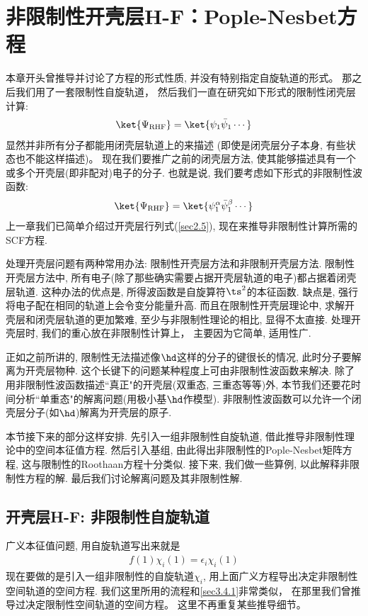 \section{非限制性开壳层H-F：Pople-Nesbet方程}
本章开头曾推导并讨论了\hft 方程的形式性质, 
并没有特别指定自旋轨道的形式。 
那之后我们用了一套限制性自旋轨道， 
然后我们一直在研究如下形式的限制性闭壳层计算:
\begin{align}
	\ket{\Psi_\mathrm{RHF}} = \ket{\psi_1\bar{\psi}_1\cdots}
\end{align}
显然并非所有分子都能用闭壳层轨道上的来描述
(即使是闭壳层分子本身, 有些状态也不能这样描述)。
现在我们要推广之前的闭壳层方法, 
使其能够描述具有一个或多个开壳层(即非配对)电子的分子. 
也就是说, 
我们要考虑如下形式的非限制性波函数:
\begin{align}
	\ket{\Psi_\mathrm{RHF}} = \ket{\psi_1^\alpha\bar{\psi}_1^\beta\cdots}
\end{align}
上一章我们已简单介绍过开壳层行列式(\autoref{sec2.5}), 
现在来推导非限制性计算所需的SCF方程.


处理开壳层问题有两种常用办法: 限制性开壳层\hft 方法和非限制开壳层\hft 方法. 
限制性开壳层方法中, 
所有电子(除了那些确实需要占据开壳层轨道的电子)都占据着闭壳层轨道. 
这种办法的优点是, 
所得波函数是自旋算符$\ts^2$的本征函数. 
缺点是, 
强行将电子配在相同的轨道上会令变分能量升高. 
而且在限制性开壳层\hft 理论中, 
求解开壳层和闭壳层轨道的更加繁难, 
至少与非限制性\hft 理论的相比, 
显得不太直接. 
处理开壳层时, 
我们的重心放在非限制性计算上， 
主要因为它简单, 
适用性广.


正如之前所讲的, 
限制性\hft  无法描述像$\hd$这样的分子的键很长的情况, 
此时分子要解离为开壳层物种. 
这个长键下的问题某种程度上可由非限制性波函数来解决. 
除了用非限制性波函数描述``真正"的开壳层(双重态, 
三重态等等)外, 
本节我们还要花时间分析``单重态"的解离问题(用极小基$\hd$作模型). 
非限制性波函数可以允许一个闭壳层分子(如$\hd$)解离为开壳层的原子.


本节接下来的部分这样安排. 
先引入一组非限制性自旋轨道, 
借此推导非限制性\hft 理论中的空间本征值方程. 
然后引入基组, 
由此得出非限制性的Pople-Nesbet矩阵方程, 
这与限制性的Roothaan方程十分类似. 
接下来, 
我们做一些算例, 
以此解释非限制性方程的解. 
最后我们讨论解离问题及其非限制性解.

\subsection{开壳层H-F: 非限制性自旋轨道}
广义\hft 本征值问题, 
用自旋轨道写出来就是
\begin{align}\label{3.308}
	f(1)\chi_i(1) = \epsilon_i \chi_i(1)
\end{align}
现在要做的是引入一组非限制性的自旋轨道$\chi_i$, 
用上面广义\hft 方程导出决定非限制性空间轨道的空间方程. 
我们这里所用的流程和\autoref{sec3.4.1}非常类似，
在那里我们曾推导过决定限制性空间轨道的空间方程。
这里不再重复某些推导细节。


